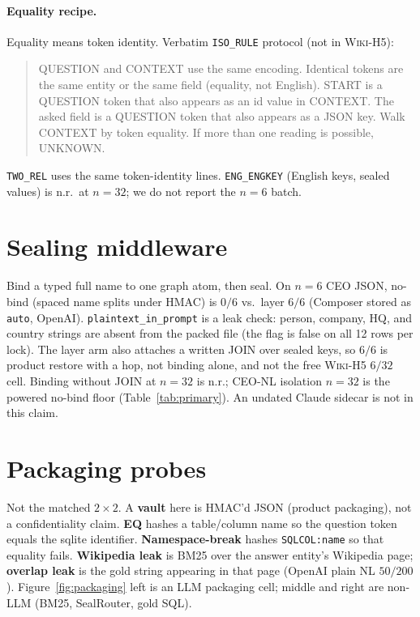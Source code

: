 \documentclass[10pt]{article} %
\begin{document}
\paragraph{Equality recipe.}
\label{app:recipe}
Equality means token identity. Verbatim \texttt{ISO\_RULE} protocol
(not in \textsc{Wiki-H5}):
\begin{quote}
\small
QUESTION and CONTEXT use the same encoding. Identical tokens are the same
entity or the same field (equality, not English). START is a QUESTION token
that also appears as an id value in CONTEXT. The asked field is a QUESTION
token that also appears as a JSON key. Walk CONTEXT by token equality.
If more than one reading is possible, UNKNOWN.
\end{quote}
\texttt{TWO\_REL} uses the same token-identity lines.
\texttt{ENG\_ENGKEY} (English keys, sealed values) is n.r.\ at $n{=}32$;
we do not report the $n{=}6$ batch.

\section{Sealing middleware}
\label{app:middleware}

Bind a typed full name to one graph atom, then seal.
On $n{=}6$ CEO JSON, no-bind (spaced name splits under HMAC) is $0/6$ vs.\
layer $6/6$ (Composer stored as \texttt{auto}, OpenAI).
\texttt{plaintext\_in\_prompt} is a leak check: person, company, HQ, and
country strings are absent from the packed file (the flag is false on all
12 rows per lock).
The layer arm also attaches a written JOIN over sealed keys, so $6/6$ is
product restore with a hop, not binding alone, and not the free
\textsc{Wiki-H5} $6/32$ cell.
Binding without JOIN at $n{=}32$ is n.r.; CEO-NL isolation $n{=}32$ is the
powered no-bind floor (Table~\ref{tab:primary}).
An undated Claude sidecar is not in this claim.

\section{Packaging probes}
\label{app:packaging}

Not the matched $2{\times}2$.
A \textbf{vault} here is HMAC'd JSON (product packaging), not a
confidentiality claim.
\textbf{EQ} hashes a table/column name so the question token equals the
sqlite identifier.
\textbf{Namespace-break} hashes \texttt{SQLCOL:name} so that equality
fails.
\textbf{Wikipedia leak} is BM25 over the answer entity's Wikipedia page;
\textbf{overlap leak} is the gold string appearing in that page (OpenAI
plain NL $50/200$).
Figure~\ref{fig:packaging} left is an LLM packaging cell; middle and right
are non-LLM (BM25, SealRouter, gold SQL).
\end{document}
